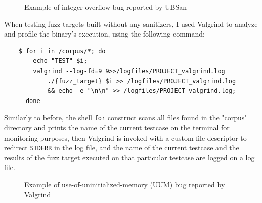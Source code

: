 \begin{figure}[h]
\caption{Example of integer-overflow bug reported by UBSan}
\label{fig:ubsan_example}
\end{figure}





\newpage
When testing fuzz targets built without any sanitizers, I used Valgrind to analyze and profile the binary's execution, using the following command:
\begin{verbatim}
    $ for i in /corpus/*; do 
        echo "TEST" $i; 
        valgrind --log-fd=9 9>>/logfiles/PROJECT_valgrind.log 
            ./{fuzz_target} $i >> /logfiles/PROJECT_valgrind.log 
            && echo -e "\n\n" >> /logfiles/PROJECT_valgrind.log; 
      done
\end{verbatim}
Similarly to before, the shell \verb|for| construct scans all files found in the "corpus" directory and prints the name of the current testcase on the terminal for monitoring purposes, then Valgrind is invoked with a custom file descriptor to redirect \verb|STDERR| in the log file, and the name of the current testcase and the results of the fuzz target executed on that particular testcase are logged on a log file.

\begin{figure}[h]
\caption{Example of use-of-uninitialized-memory (UUM) bug reported by Valgrind}
\label{fig:valgrind_example}
\end{figure}



